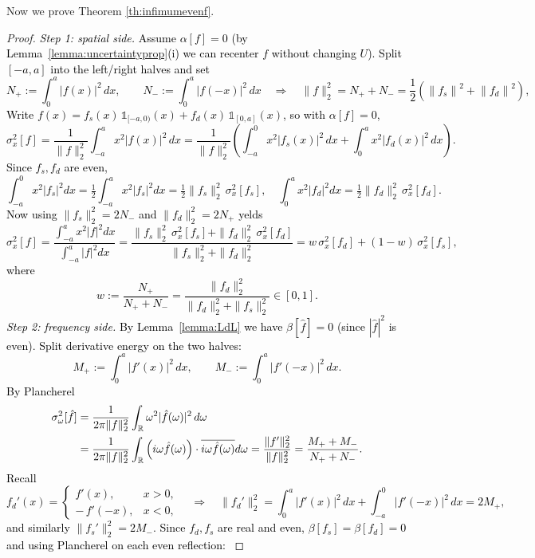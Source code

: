 \documentclass[preprint,hidelinks,authoryear]{elsarticle}
\theoremstyle{plain}
\theoremstyle{definition}
\theoremstyle{remark}
\begin{document}
Now we prove Theorem \ref{th:infimumevenf}.


\begin{proof}
\textcolor{black}{\emph{Step 1: spatial side.} Assume $\alpha[f]=0$ (by Lemma~\ref{lemma:uncertaintyprop}(i) we can recenter $f$ without changing $U$).
Split $[-a,a]$ into the left/right halves and set
$$
N_+ := \int_{0}^{a}|f(x)|^2\,dx,\qquad N_- := \int_{0}^{a}|f(-x)|^2\,dx
\quad\Rightarrow\quad \|f\|_2^2=N_++N_- =\frac{1}{2}(\left\|f_s\right\|^2+\left\|f_d\right\|^2),$$
Write $f(x)=f_s(x)\,\mathds 1_{[-a,0)}(x)+f_d(x)\,\mathds 1_{[0,a]}(x)$, so with $\alpha[f]=0$,
$$
\sigma_x^2[f]=\frac{1}{\|f\|_2^2}\int_{-a}^a x^2|f(x)|^2\,dx
=\frac{1}{\|f\|_2^2}\!\left(\int_{-a}^0 x^2|f_s(x)|^2\,dx+\int_0^a x^2|f_d(x)|^2\,dx\right).
$$
Since $f_s,f_d$ are even,
$$
\int_{-a}^0 x^2|f_s|^2dx=\tfrac12\!\int_{-a}^a x^2|f_s|^2dx=\tfrac12\|f_s\|_2^2\,\sigma_x^2[f_s],\quad
\int_0^a x^2|f_d|^2dx=\tfrac12\|f_d\|_2^2\,\sigma_x^2[f_d].
$$
Now using $\|f_s\|_2^2=2N_{-}$ and $\|f_d\|_2^2=2N_{+}$ yelds
$$\sigma_x^2[f]=\frac{\int_{-a}^a x^2|f|^2dx}{\int_{-a}^a |f|^2dx}
= \frac{\|f_s\|_2^2\,\sigma_x^2[f_s] + \|f_d\|_2^2\,\sigma_x^2[f_d]}{\|f_s\|_2^2+\|f_d\|_2^2}
= w\,\sigma_x^2[f_d] + (1-w)\,\sigma_x^2[f_s],$$
where
\begin{equation}
\label{eq:w}
w:=\frac{N_+}{N_+ + N_-}
=\frac{\|f_d\|_2^2}{\|f_d\|_2^2+\|f_s\|_2^2}\in[0,1].    
\end{equation}
\emph{Step 2: frequency side.} By Lemma~\ref{lemma:LdL} we have $\beta[\hat f]=0$ (since $|\hat f|^2$ is even). Split derivative energy on the two halves:
$$
M_+ := \int_{0}^{a}|f'(x)|^2\,dx,\qquad
M_- := \int_{0}^{a}|f'(-x)|^2\,dx.
$$
By Plancherel
\begin{align}
\label{eq:sigw-f}
\sigma_\omega^2[\hat f]
&=\frac{1}{2\pi\|f\|_2^2}\int_{\mathbb R}\omega^2|\hat f(\omega)|^2\,d\omega \notag \\
&=\frac{1}{2\pi\|f\|_2^2}\int_{\mathbb{R}}\left(i \omega \hat{f}(\omega)\right) \cdot \overline{i \omega \hat{f}(\omega)} d \omega
=\frac{\|f'\|_2^2}{\|f\|_2^2}
=\frac{M_+ + M_-}{N_+ + N_-}.
\end{align}
Recall
$$
f_d'(x)=\begin{cases}f'(x),& x>0,\\ -\,f'(-x),& x<0,\end{cases}
\quad\Rightarrow\quad
\|f_d'\|_2^2=\int_{0}^{a}|f'(x)|^2\,dx+\int_{-a}^{0}|f'(-x)|^2\,dx=2M_+,
$$
and similarly
$
\|f_s'\|_2^2=2M_-.
$
Since $f_d,f_s$ are real and even, $\beta[f_s]=\beta[f_d]=0$ and using Plancherel on each even reflection:
}
\end{proof}
\end{document}
